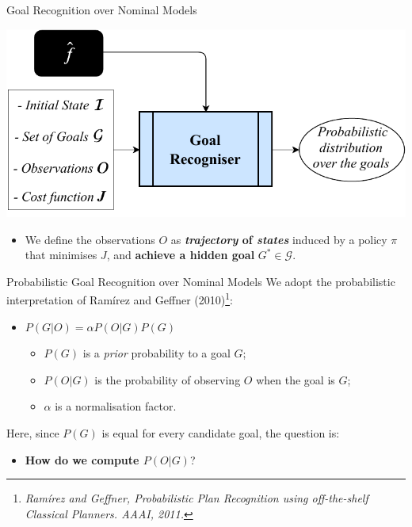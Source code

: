 \documentclass[usenames,dvipsnames]{beamer}
\begin{document}
    \begin{frame}[c]{Goal Recognition over Nominal Models}
		\begin{center}
			\includegraphics[width=0.85\linewidth]{fig/GR_ApproximatedModels-ProblemOverview.pdf}
		\end{center}
		
		\begin{itemize}
			\item We define the observations $O$ as \textbf{\emph{trajectory} of \emph{states}} induced by a policy
	$\pi$ that minimises $J$, and \textbf{achieve a hidden goal} $G^* \in \mathcal{G}$.
		\end{itemize}
    \end{frame}
	
    \begin{frame}{Probabilistic Goal Recognition over Nominal Models}
			We adopt the probabilistic interpretation of Ramírez and Geffner (2010)\footnote{\tiny \it Ramírez and Geffner, Probabilistic Plan Recognition using off-the-shelf Classical Planners. AAAI, 2011.}:
			\vspace{2mm}
			\begin{itemize}
				\item $P(G|O) = \alpha P(O|G) P(G)$
				\vspace{1mm}
				\begin{itemize}
					\item $P(G)$ is a \emph{prior} probability to a goal $G$;
					\vspace{1.5mm}
					\item $P(O|G)$ is the probability of observing $O$ when the goal is $G$;
					\vspace{1.5mm}
					\item $\alpha$ is a normalisation factor.
				\end{itemize}
			\end{itemize}
			\vspace{5mm}
			Here, since $P(G)$ is equal for every candidate goal, the question is: 
			\begin{itemize}
				\item \textbf{How do we compute $P(O|G)$}?
			\end{itemize}
    \end{frame}
	
\end{document}
